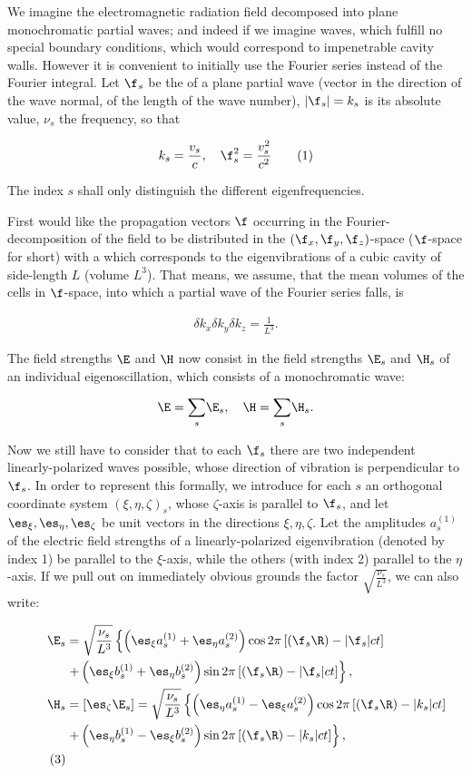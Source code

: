 \documentclass{article}
\newcommand{\nequ}[2]{
\begin{align*}
#1
\tag{#2}
\end{align*}
}
\newcommand{\uequ}[1]{
\begin{align*}
#1
\end{align*}
}
\newcommand{\sumX}[1]{\underset{#1}{\sum}}
\begin{document}
We imagine the electromagnetic radiation field decomposed into plane monochromatic partial waves; and indeed if we imagine  waves, which fulfill no special boundary conditions, which would correspond to impenetrable cavity walls. However it is convenient to initially use the Fourier series instead of the Fourier integral. Let $\f_s$ be the  of a plane partial wave (vector in the direction of the wave normal, of the length of the wave number), $|\f_s|=k_s$ is its absolute value, $\nu_s$ the frequency, so that
\nequ{
k_s = \frac{v_s}{c},\quad \f_s^2 = \frac{v_s^2}{c^2}
}{1}
The index $s$ shall only distinguish the different eigenfrequencies.

First would like the propagation vectors $\f$ occurring in the Fourier-decomposition of the field
to be distributed in the $(\f_x,\f_y,\f_z)$-space ($\f$-space for short) with a  which corresponds to the eigenvibrations of a cubic cavity of side-length $L$ (volume $L^3$). That means, we assume, that the mean volumes of the cells in $\f$-space, into which a partial wave of the Fourier series falls, is
\nequ{
\delta k_x \delta k_y \delta k_z = \frac{1}{L^3}.
}{2}
The field strengths $\E$ and $\H$ now consist in the field strengths $\E_s$ and $\H_s$ of an individual eigenoscillation, which consists of a monochromatic wave:
\uequ{
\E=\sumX{s}\E_s,\quad \H = \sumX{s}\H_s.
}
Now we still have to consider that to each $\f_s$ there are two independent linearly-polarized waves possible, whose direction of vibration is perpendicular to $\f_s$. In order to represent this formally, we introduce for each $s$ an orthogonal coordinate system $(\xi,\eta,\zeta)_s$, whose $\zeta$-axis is parallel to $\f_s$, and let $\es_\xi,\es_\eta,\es_\zeta$ be unit vectors in the directions $\xi,\eta,\zeta$. Let the amplitudes $a^{(1)}_s$ of the electric field strengths of a linearly-polarized eigenvibration (denoted by index 1) be parallel to the $\xi$-axis, while the others (with index 2) parallel to the $\eta$-axis. If we pull out on immediately obvious grounds the factor $\sqrt{\frac{\nu_s}{L^3}}$, we can also write:
\nequ{
\E_s &= \sqrt{\frac{\nu_s}{L^3}}\left\{\left(\es_\xi a_s^{(1)} + \es_\eta a_s^{(2)}\right)
\cos 2\pi \left[(\f_s \R) - |\f_s|ct \right] \right.\\
&\left. + \left(\es_\xi b_s^{(1)} + \es_\eta b_s^{(2)}\right)
\sin 2\pi \left[(\f_s \R) - |\f_s|ct \right]\right\},\\
\H_s &= [\es_\zeta \E_s]
      = \sqrt{\frac{\nu_s}{L^3}}\left\{\left(\es_\eta a_s^{(1)} - \es_\xi a_s^{(2)}\right)
\cos 2\pi \left[(\f_s \R) - |k_s|ct \right] \right.\\
&\left. + \left(\es_\eta b_s^{(1)} - \es_\xi b_s^{(2)}\right)
\sin 2\pi \left[(\f_s \R) - |k_s|ct \right]\right\},\\
}{3}
\end{document}
